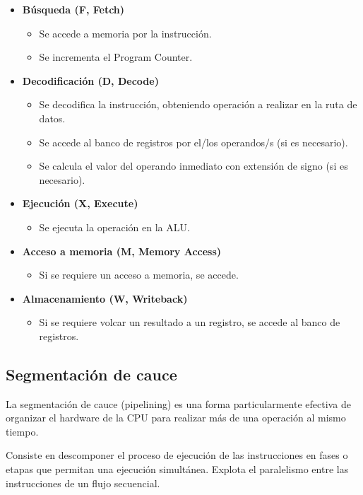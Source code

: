 \begin{itemize}
  \item \textbf{Búsqueda (F, Fetch)}
  \begin{itemize}
    \item Se accede a memoria por la instrucción.
    \item Se incrementa el Program Counter.
  \end{itemize}
  \item \textbf{Decodificación (D, Decode)}
  \begin{itemize}
    \item Se decodifica la instrucción, obteniendo operación a realizar en la ruta de datos.
    \item Se accede al banco de registros por el/los operandos/s (si es necesario).
    \item Se calcula el valor del operando inmediato con extensión de signo (si es necesario).
  \end{itemize}
  \item \textbf{Ejecución (X, Execute)}
  \begin{itemize}
    \item Se ejecuta la operación en la ALU.\@
  \end{itemize}
  \item \textbf{Acceso a memoria (M, Memory Access)}
  \begin{itemize}
    \item Si se requiere un acceso a memoria, se accede.
  \end{itemize}
  \item \textbf{Almacenamiento (W, Writeback)}
  \begin{itemize}
    \item Si se requiere volcar un resultado a un registro, se accede al banco de registros.
  \end{itemize}
\end{itemize}

\subsection{Segmentación de cauce}

La segmentación de cauce (pipelining) es una forma particularmente efectiva de organizar el hardware de la CPU para realizar más de una operación al mismo tiempo. 

Consiste en descomponer el proceso de ejecución de las instrucciones en fases o etapas que permitan una ejecución simultánea. Explota el paralelismo entre las instrucciones de un flujo secuencial.


